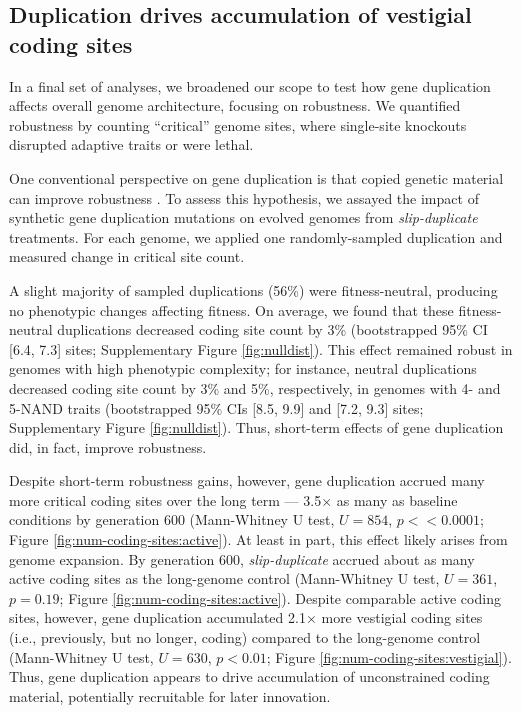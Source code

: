 \subsection{Duplication drives accumulation of vestigial coding sites}



In a final set of analyses, we broadened our scope to test how gene duplication affects overall genome architecture, focusing on robustness.
We quantified robustness by counting ``critical'' genome sites, where single-site knockouts disrupted adaptive traits or were lethal.

One conventional perspective on gene duplication is that copied genetic material can improve robustness \citep{wagner1996genetic}.
To assess this hypothesis, we assayed the impact of synthetic gene duplication mutations on evolved genomes from \textit{slip-duplicate} treatments.
For each genome, we applied one randomly-sampled duplication and measured change in critical site count.

A slight majority of sampled duplications (56\%) were fitness-neutral, producing no phenotypic changes affecting fitness.
On average, we found that these fitness-neutral duplications decreased coding site count by 3\% (bootstrapped 95\% CI [6.4, 7.3] sites; Supplementary Figure \ref{fig:nulldist}). %
This effect remained robust in genomes with high phenotypic complexity; for instance, neutral duplications decreased coding site count by 3\% and 5\%, respectively, in genomes with 4- and 5-NAND traits (bootstrapped 95\% CIs [8.5, 9.9] and [7.2, 9.3] sites; Supplementary Figure \ref{fig:nulldist}).
Thus, short-term effects of gene duplication did, in fact, improve robustness.

Despite short-term robustness gains, however, gene duplication accrued many more critical coding sites over the long term --- 3.5$\times$ as many as baseline conditions by generation 600 (Mann-Whitney U test, $U=854$, $p << 0.0001$; Figure \ref{fig:num-coding-sites:active}). %
At least in part, this effect likely arises from genome expansion.
By generation 600, \textit{slip-duplicate} accrued about as many active coding sites as the long-genome control (Mann-Whitney U test, $U=361$, $p=0.19$; Figure \ref{fig:num-coding-sites:active}).
Despite comparable active coding sites, however, gene duplication accumulated 2.1$\times$ more vestigial coding sites (i.e., previously, but no longer, coding) compared to the long-genome control (Mann-Whitney U test, $U=630$, $p<0.01$; Figure \ref{fig:num-coding-sites:vestigial}). %
Thus, gene duplication appears to drive accumulation of unconstrained coding material, potentially recruitable for later innovation.

